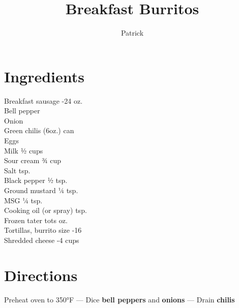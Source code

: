 \documentclass[11pt,letterpaper]{article}
\title{Breakfast Burritos}
\author{Patrick }
\date{}
\begin{document}
\maketitle
\thispagestyle{empty}

\section*{Ingredients}
\setlength{\columnsep}{20pt}
\begin{multicols}{2}
\noindent
    Breakfast sausage -24 oz. \\
    Bell pepper  \\
    Onion  \\
    Green chilis  (6oz.) can \\
    Eggs  \\
    Milk  ½ cups \\
    \columnbreak
    Sour cream \dotfill ¾ cup \\
    Salt  tsp. \\
    Black pepper \dotfill ½ tsp. \\
    Ground mustard \dotfill ¼ tsp. \\
    MSG \dotfill ¼ tsp. \\
    Cooking oil (or spray)  tsp. \\
    Frozen tater tots  oz. \\
    Tortillas, burrito size -16 \\
    Shredded cheese -4 cups
\end{multicols}

\section*{Directions}
\noindent
Preheat oven to 350°F --- Dice \textbf{bell peppers} and \textbf{onions} --- Drain \textbf{chilis}
\end{document}

